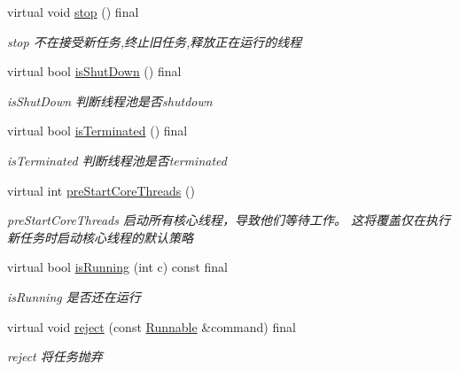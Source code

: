 \begin{DoxyCompactItemize}
virtual void \hyperlink{classThreadPoolExecutor_a588ec33baf402afd0e1c52b11d9234da}{stop} () final
\begin{DoxyCompactList}\small\item\em stop 不在接受新任务,终止旧任务,释放正在运行的线程 \end{DoxyCompactList}\item 
virtual bool \hyperlink{classThreadPoolExecutor_ac33c356670eabe5345992331e615348c}{is\+Shut\+Down} () final
\begin{DoxyCompactList}\small\item\em is\+Shut\+Down 判断线程池是否shutdown \end{DoxyCompactList}\item 
virtual bool \hyperlink{classThreadPoolExecutor_a89ed68d6c67ad6fbde73b7883c8107a7}{is\+Terminated} () final
\begin{DoxyCompactList}\small\item\em is\+Terminated 判断线程池是否terminated \end{DoxyCompactList}\item 
virtual int \hyperlink{classThreadPoolExecutor_aab8b3946a87fbecd144b159c12c8bcfb}{pre\+Start\+Core\+Threads} ()
\begin{DoxyCompactList}\small\item\em pre\+Start\+Core\+Threads 启动所有核心线程，导致他们等待工作。 这将覆盖仅在执行新任务时启动核心线程的默认策略 \end{DoxyCompactList}\item 
virtual bool \hyperlink{classThreadPoolExecutor_a841ae2189d6f85b9df9f69dec5375341}{is\+Running} (int c) const final
\begin{DoxyCompactList}\small\item\em is\+Running 是否还在运行 \end{DoxyCompactList}\item 
virtual void \hyperlink{classThreadPoolExecutor_a14c4e3d786dcf22e858b11a95d2f77ef}{reject} (const \hyperlink{classRunnable}{Runnable} \&command) final
\begin{DoxyCompactList}\small\item\em reject 将任务抛弃 \end{DoxyCompactList}\end{DoxyCompactItemize}
